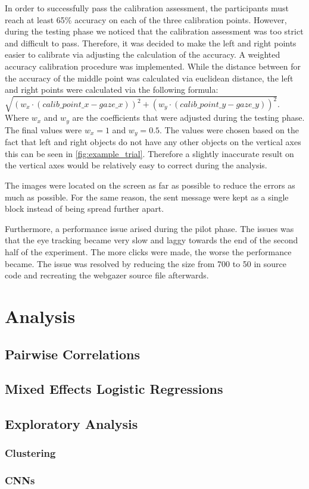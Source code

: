 In order to successfully pass the calibration assessment, the participants must reach at least 65\% accuracy on each of the three calibration points. However, during the testing phase we noticed that the calibration assessment was too strict and difficult to pass. Therefore, it was decided to make the left and right points easier to calibrate via adjusting the calculation of the accuracy. A weighted accuracy calibration procedure was implemented. While the distance between for the accuracy of the middle point was calculated via euclidean distance, the left and right points were calculated via the following formula: $\sqrt{(w_x\cdot(calib\_point\_x - gaze\_x))^2 + (w_y\cdot(calib\_point\_y - gaze\_y))^2}$. Where $w_x$ and $w_y$ are the coefficients that were adjusted during the testing phase. The final values were $w_x = 1$ and $w_y = 0.5$. The values were chosen based on the fact that left and right objects do not have any other objects on the vertical axes this can be seen in \autoref{fig:example_trial}. Therefore a slightly inaccurate result on the vertical axes would be relatively easy to correct during the analysis.

The images were located on the screen as far as possible to reduce the errors as much as possible. For the same reason, the sent message were kept as a single block instead of being spread further apart. 

Furthermore, a performance issue arised during the pilot phase. The issues was that the eye tracking became very slow and laggy towards the end of the second half of the experiment. The more clicks were made, the worse the performance became. The issue was resolved by reducing the  size from 700 to 50 in source code and recreating the webgazer source file afterwards.

\section{Analysis}
\label{sec:analysis}

\subsection{Pairwise Correlations}
\label{sec:analysis:corr}

\subsection{Mixed Effects Logistic Regressions}
\label{sec:analysis:mixed_effects}

\subsection{Exploratory Analysis}
\label{sec:analysis:exploratory}

\subsubsection{Clustering}
\label{sec:analysis:exploratory:clustering}

\subsubsection{CNNs}
\label{sec:analysis:exploratory:cnn}
